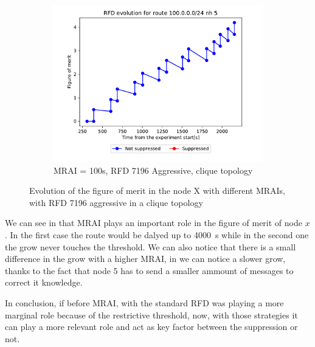 \begin{figure}[h]
\begin{subfigure}[b]{0.3\textwidth}
         \label{fig:clique_x_mrai50_rfd7196Aggressive}
     \end{subfigure}
     \hfill
     \begin{subfigure}[b]{0.3\textwidth}
         \centering
         \includegraphics[width=\textwidth]{images/RFD/clique/FigureOfMerit/mrai21_RFD_7196_aggressive_x_rfd_R1.pdf}
         \caption{MRAI = 100s, RFD 7196 Aggressive, clique topology}
         \label{fig:clique_x_mrai100_rfd7196Aggressive}
     \end{subfigure}
        \caption{Evolution of the figure of merit in the node X with different MRAIs, with RFD 7196 aggressive in a clique topology}
        \label{fig:clique_nodex_rfd7196Aggressive}
\end{figure}

We can see in 
that \ac{MRAI} plays an important role in the figure of merit of node $x$.
In the first case the route would be dalyed up to \SI{4000}{\second} while
in the second one the grow never touches the threshold.
We can also notice that there is a small difference in the grow with a higher
\ac{MRAI}, in  we can notice a 
slower grow, thanks to the fact that node \num{5} has to send a smaller ammount
of messages to correct it knowledge.

In conclusion, if before \ac{MRAI}, with the standard \ac{RFD} was playing a more
marginal role because of the restrictive threshold, now, with those strategies
it can play a more relevant role and act as key factor between the suppression 
or not.

